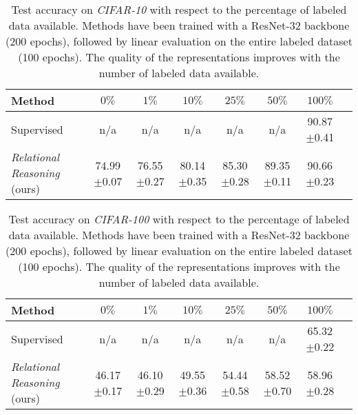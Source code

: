 \documentclass{article}
\begin{document}
\begin{table}[H]
 \caption{Test accuracy on \emph{CIFAR-10} with respect to the percentage of labeled data available. Methods have been trained with a ResNet-32 backbone (200 epochs), followed by linear evaluation on the entire labeled dataset (100 epochs). The quality of the representations improves with the number of labeled data available.}
 \label{tab:semisupervised-cifar10}
 \begin{adjustbox}{width=1.0\columnwidth,center}
  \centering
  \begin{tabular}{lccccccc}
    \toprule
    \textbf{Method} &
    $0\%$ & $1\%$ & $10\%$ & $25\%$ & $50\%$& $100\%$\\
    \midrule
    Supervised & 
    n/a & n/a & n/a & n/a & n/a & 90.87$\pm$\small{0.41}\\
    \emph{Relational Reasoning} (ours) & 
    74.99$\pm$\small{0.07} & 76.55$\pm$\small{0.27} & 80.14$\pm$\small{0.35} & 85.30$\pm$\small{0.28} &
    89.35$\pm$\small{0.11} & 90.66$\pm$\small{0.23} \\
    \bottomrule
  \end{tabular}
 \end{adjustbox}
\end{table}

\begin{table}[H]
 \caption{Test accuracy on \emph{CIFAR-100} with respect to the percentage of labeled data available. Methods have been trained with a ResNet-32 backbone (200 epochs), followed by linear evaluation on the entire labeled dataset (100 epochs). The quality of the representations improves with the number of labeled data available.}
 \label{tab:semisupervised-cifar100}
 \begin{adjustbox}{width=1.0\columnwidth,center}
  \centering
  \begin{tabular}{lccccccc}
    \toprule
    \textbf{Method} &
    $0\%$ & $1\%$ & $10\%$ & $25\%$ & $50\%$& $100\%$\\
    \midrule
    Supervised & 
    n/a & n/a & n/a & n/a & n/a & 65.32$\pm$\small{0.22}\\
    \emph{Relational Reasoning} (ours) & 
    46.17$\pm$\small{0.17} & 46.10$\pm$\small{0.29} & 49.55$\pm$\small{0.36} & 54.44$\pm$\small{0.58} &
    58.52$\pm$\small{0.70} & 58.96$\pm$\small{0.28} \\
    \bottomrule
  \end{tabular}
 \end{adjustbox}
\end{table}
\end{document}
